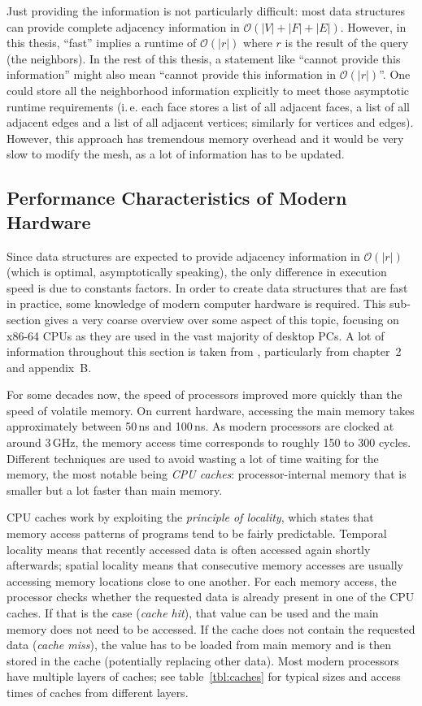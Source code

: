 Just providing the information is not particularly difficult:
most data structures can provide complete adjacency information in $\mathcal O(|V| + |F| + |E|)$.
However, in this thesis, \enquote{fast} implies a runtime of $\mathcal O(|r|)$ where $r$ is the result of the query (the neighbors). In the rest of this thesis, a statement like \enquote{cannot provide this information} might also mean \enquote{cannot provide this information in $\mathcal O(|r|)$}.
One could store all the neighborhood information explicitly to meet those asymptotic runtime requirements (i.\,e. each face stores a list of all adjacent faces, a list of all adjacent edges and a list of all adjacent vertices; similarly for vertices and edges).
However, this approach has tremendous memory overhead and it would be very slow to modify the mesh, as a lot of information has to be updated.

\subsection{Performance Characteristics of Modern Hardware}

Since data structures are expected to provide adjacency information in $\mathcal O(|r|)$ (which is optimal, asymptotically speaking), the only difference in execution speed is due to constants factors.
In order to create data structures that are fast in practice, some knowledge of modern computer hardware is required.
This sub-section gives a very coarse overview over some aspect of this topic, focusing on x86-64 CPUs as they are used in the vast majority of desktop PCs.
A lot of information throughout this section is taken from \cite{hennessy2017computer}, particularly from chapter~2 and appendix~B.

For some decades now, the speed of processors improved more quickly than the speed of volatile memory.
On current hardware, accessing the main memory takes approximately between 50\,ns and 100\,ns.
As modern processors are clocked at around 3\,GHz, the memory access time corresponds to roughly 150 to 300 cycles.
Different techniques are used to avoid wasting a lot of time waiting for the memory, the most notable being \emph{CPU caches}: processor-internal memory that is smaller but a lot faster than main memory.

CPU caches work by exploiting the \emph{principle of locality}, which states that memory access patterns of programs tend to be fairly predictable.
Temporal locality means that recently accessed data is often accessed again shortly afterwards;
spatial locality means that consecutive memory accesses are usually accessing memory locations close to one another.
For each memory access, the processor checks whether the requested data is already present in one of the CPU caches.
If that is the case (\emph{cache hit}), that value can be used and the main memory does not need to be accessed.
If the cache does not contain the requested data (\emph{cache miss}), the value has to be loaded from main memory and is then stored in the cache (potentially replacing other data).
Most modern processors have multiple layers of caches; see table~\ref{tbl:caches} for typical sizes and access times of caches from different layers.

